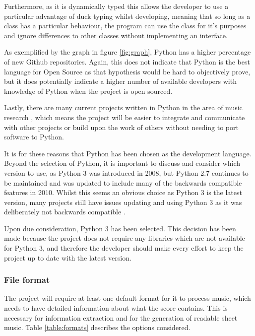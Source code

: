  Furthermore, as it is dynamically typed this allows the developer to use a particular advantage of duck typing whilst developing, meaning that so long as a class has a particular behaviour, the program can use the class for it's purposes and ignore differences to other classes without implementing an interface.
 
 As exemplified by the graph in figure \ref{fig:graph}, Python has a higher percentage of new Github repositories. Again, this does not indicate that Python is the best language for Open Source as that hypothesis would be hard to objectively prove, but it does potentially indicate a higher number of available developers with knowledge of Python when the project is open sourced.
 
 Lastly, there are many current projects written in Python in the area of music research \parencite{pmus}, which means the project will be easier to integrate and communicate with other projects or build upon the work of others without needing to port software to Python.

It is for these reasons that Python has been chosen as the development language. Beyond the selection of Python, it is important to discuss and consider which version to use, as Python 3 was introduced in 2008, but Python 2.7 continues to be maintained and was updated to include many of the backwards compatible features in 2010. Whilst this seems an obvious choice as Python 3 is the latest version, many projects still have issues updating and using Python 3 as it was deliberately not backwards compatible \parencite{Foundation2}.

Upon due consideration, Python 3 has been selected. This decision has been made because the project does not require any libraries which are not available for Python 3, and therefore the developer should make every effort to keep the project up to date with the latest version.

\subsubsection{File format}
The project will require at least one default format for it to process music, which needs to have detailed information about what the score contains. This is necessary for information extraction and for the generation of readable sheet music. Table \ref{table:formats} describes the options considered.

